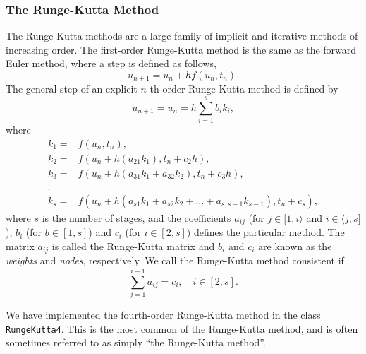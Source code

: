     

    \subsubsection{The Runge-Kutta Method}

    The Runge-Kutta methods are a large family of implicit and iterative methods of 
    increasing order. The first-order Runge-Kutta method is the same as the forward 
    Euler method, where a step is defined as follows, 
    \begin{equation}
        u_{n+1} = u_n + h f(u_n, t_n).
    \end{equation}
    The general step of an explicit $n$-th order Runge-Kutta method is defined
    by
    \begin{equation}
        u_{n+1} = u_n = h \sum_{i=1}^s b_i k_i,
    \end{equation}
    where 
    \begin{equation}
        \begin{aligned}
            k_1 =& f(u_n, t_n), \\
            k_2 =& f(u_n + h(a_{21}k_1), t_n + c_2h), \\
            k_3 =& f(u_n + h(a_{31}k_1 + a_{32}k_2), t_n + c_3h), \\
                \vdots& \\
            k_s =& f(u_n + h(a_{s1}k_1 + a_{s2}k_2 + \dots + a_{s,s-1}k_{s-1}), t_n + c_s),
        \end{aligned}
    \end{equation}
    where $s$ is the number of stages, and the coefficients $a_{ij}$ 
    (for $j\in[1,i\rangle$ and $i\in\langle j, s]$), $b_i$ (for $b\in[1,s]$)
    and $c_i$ (for $i\in[2,s]$) defines the particular method. The matrix 
    $a_{ij}$ is called the Runge-Kutta matrix and $b_i$ and $c_i$ are known as the 
    \emph{weights} and \emph{nodes}, respectively. We call the Runge-Kutta method consistent 
    if
    \begin{equation*}
        \sum_{j=1}^{i-1} a_{ij} = c_i, \quad i \in[2,s].
    \end{equation*}

    We have implemented the fourth-order Runge-Kutta method in the class
    \lstinline{RungeKutta4}. This is the most common of the Runge-Kutta method, and is 
    often sometimes referred to as simply ``the Runge-Kutta method''. 

    

